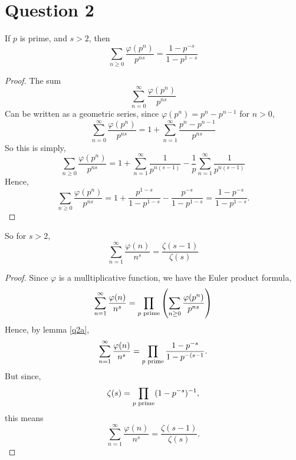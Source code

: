 \documentclass{unswmaths}
\begin{document}
    \section*{Question 2}
    \begin{lemma}
    \label{q2a}
        If $p$ is prime, and $s > 2$, then
        \begin{equation*}
            \sum_{n\geq 0} \frac{\varphi(p^n)}{p^{ns}} = \frac{1-p^{-s}}{1-p^{1-s}}
        \end{equation*}
    \end{lemma}
    \begin{proof}
        The sum
        \begin{equation*}
            \sum_{n=0}^\infty \frac{\varphi(p^n)}{p^{ns}}
        \end{equation*}
        Can be written as a geometric series, since $\varphi(p^n) = p^n-p^{n-1}$ for $n > 0$,
        \begin{equation*}
            \sum_{n=0}^\infty \frac{\varphi(p^n)}{p^{ns}} = 1+\sum_{n=1}^\infty \frac{p^n-p^{n-1}}{p^{ns}}
        \end{equation*}
        So this is simply,
        \begin{equation*}
            \sum_{n\geq 0} \frac{\varphi(p^n)}{p^{ns}} = 1+\sum_{n=1}^\infty \frac{1}{p^{n(s-1)}} - \frac{1}{p}\sum_{n=1}^\infty \frac{1}{p^{n(s-1)}}
        \end{equation*}
        Hence,
        \begin{equation*}
            \sum_{n\geq 0} \frac{\varphi(p^n)}{p^{{ns}}} = 1+\frac{p^{1-s}}{1-p^{1-s}}-\frac{p^{-s}}{1-p^{1-s}} = \frac{1-p^{-s}}{1-p^{1-s}}.
        \end{equation*}
    \end{proof}
    \begin{theorem}
    So for $s > 2$, 
        \begin{equation*}
            \sum_{n = 1}^\infty \frac{\varphi(n)}{n^s}  = \frac{\zeta(s-1)}{\zeta(s)}
       \end{equation*}
    \end{theorem}
    \begin{proof}
        Since $\varphi$ is a mulltiplicative function, we have the Euler product formula,
        \begin{equation*}
            \sum_{n=1}^\infty \frac{\varphi(n)}{n^s} = \prod_{{p\text{ prime}}} \left(\sum_{n\geq 0}\frac{\varphi(p^n)}{p^{ns}}\right)
        \end{equation*}
        Hence, by lemma \ref{q2a},
        \begin{equation*}
            \sum_{n=1}^\infty \frac{\varphi(n)}{n^s} = \prod_{{p\text{ prime}}} \frac{1-p^{-s}}{1-p^{-(s-1}}.
        \end{equation*}
        But since,
        \begin{equation*}
            \zeta(s) = \prod_{{p\text{ prime}}} (1-p^{-s})^{-1},
        \end{equation*}
        this means
        \begin{equation*}
            \sum_{n=1}^\infty \frac{\varphi(n)}{n^s} = \frac{\zeta(s-1)}{\zeta(s)}.
        \end{equation*}
    \end{proof}
    
\end{document}
